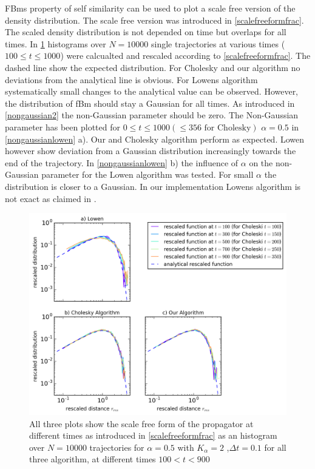 \documentclass[
  a4paper,BCOR10mm,oneside,
  bibtotoc,idxtotoc,
  headsepline,footsepline,%
  fleqn,openbib
]{scrbook}
\begin{document}
FBms property of self similarity can be used to plot a scale free version of the density distribution. The scale free version was introduced in \cref{scalefreeformfrac}. The scaled density distribution is not depended on time but overlaps for all times. In \cref{rescaledfunction}  histograms over $N=10000$ single trajectories at various times ($100\leq t \leq 1000$) were calcualted and rescaled according to \cref{scalefreeformfrac}. The dashed line show the expected distribution. For Cholesky and our algorithm no deviations from the analytical line is obvious. For Lowens algorithm systematically small changes to the analytical value can be observed. However, the distribution of fBm should stay a Gaussian for all times.  As introduced in \cref{nongaussian2} the non-Gaussian parameter should be zero. The Non-Gaussian parameter has been plotted for $0 \leq t \leq 1000 (\leq 356 \text{ for Cholesky})$  $\alpha=0.5$  in \cref{nongaussianlowen} a). Our and Cholesky algorithm perform as expected. Lowen however show deviation from a Gaussian distribution increasingly towards the end of the trajectory. In  \cref{nongaussianlowen} b) the influence of $\alpha$ on the non-Gaussian parameter for the Lowen algorithm was tested. For small $\alpha$ the distribution is closer to a Gaussian. In our implementation Lowens algorithm is not exact as claimed in \cite{Lowen1999}.

\begin{figure}[h!]
\centering
\includegraphics[width=\textwidth]{./data/scaledfunctionneu.png}
\caption{All three plots show the scale free form of the propagator at different times as introduced in \cref{scalefreeformfrac} as an histogram over $N=10000$ trajectories for $\alpha=0.5$  with $K_{\alpha}=2$ ,$\Delta t = 0.1$ for all three algorithm, at different times $100<t<900$}
\label{rescaledfunction}
\end{figure}
\end{document}
